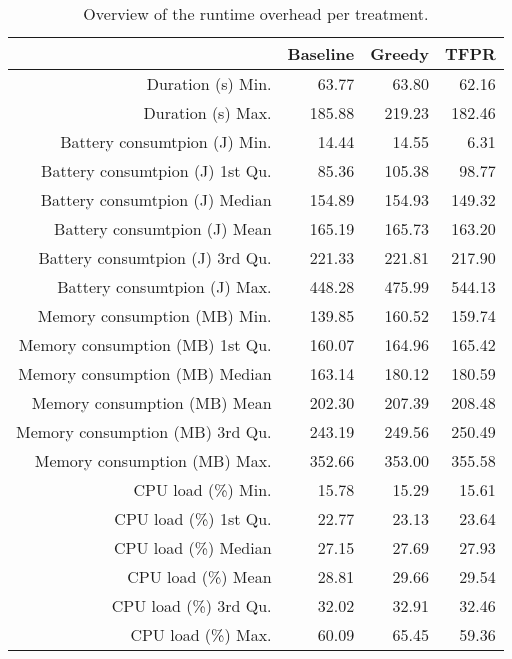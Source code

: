 \begin{table}[ht]
\centering
\begin{tabular}{rrrr}
  \hline
 & Baseline & Greedy & TFPR \\ 
  \hline
Duration (s) Min. & 63.77 & 63.80 & 62.16 \\ 
  Duration (s) Max. & 185.88 & 219.23 & 182.46 \\ 
  Battery consumtpion (J) Min. & 14.44 & 14.55 & 6.31 \\ 
  Battery consumtpion (J) 1st Qu. & 85.36 & 105.38 & 98.77 \\ 
  Battery consumtpion (J) Median & 154.89 & 154.93 & 149.32 \\ 
  Battery consumtpion (J) Mean & 165.19 & 165.73 & 163.20 \\ 
  Battery consumtpion (J) 3rd Qu. & 221.33 & 221.81 & 217.90 \\ 
  Battery consumtpion (J) Max. & 448.28 & 475.99 & 544.13 \\ 
  Memory consumption (MB) Min. & 139.85 & 160.52 & 159.74 \\ 
  Memory consumption (MB) 1st Qu. & 160.07 & 164.96 & 165.42 \\ 
  Memory consumption (MB) Median & 163.14 & 180.12 & 180.59 \\ 
  Memory consumption (MB) Mean & 202.30 & 207.39 & 208.48 \\ 
  Memory consumption (MB) 3rd Qu. & 243.19 & 249.56 & 250.49 \\ 
  Memory consumption (MB) Max. & 352.66 & 353.00 & 355.58 \\ 
  CPU load (\%) Min. & 15.78 & 15.29 & 15.61 \\ 
  CPU load (\%) 1st Qu. & 22.77 & 23.13 & 23.64 \\ 
  CPU load (\%) Median & 27.15 & 27.69 & 27.93 \\ 
  CPU load (\%) Mean & 28.81 & 29.66 & 29.54 \\ 
  CPU load (\%) 3rd Qu. & 32.02 & 32.91 & 32.46 \\ 
  CPU load (\%) Max. & 60.09 & 65.45 & 59.36 \\ 
   \hline
\end{tabular}
\caption{Overview of the runtime overhead per treatment.} 
\label{tab:results:rq1:summary:treatment}
\end{table}
